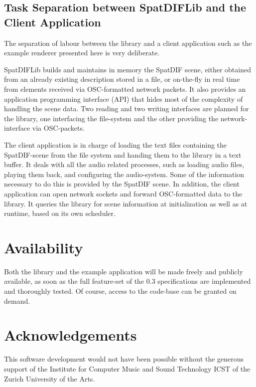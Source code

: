 \documentclass[a4paper]{article}
\begin{document}
\subsection{Task Separation between SpatDIFLib and the Client Application}

The separation of labour between the library and a client application such as the example renderer presented here is very deliberate.

SpatDIFLib builds and maintains in memory the SpatDIF scene, either obtained from an already existing description stored in a file, or on-the-fly in real time from elements received via OSC-formatted network packets.
It also provides an application programming interface (API) that hides most of the complexity of handling the scene data.
Two reading and two writing interfaces are planned for the library, one interfacing the file-system and the other providing the network-interface via OSC-packets.

The client application is in charge of loading the text files containing the SpatDIF-scene from the file system and handing them to the library in a text buffer.
It deals with all the audio related processes, such as loading audio files, playing them back, and configuring the audio-system.
Some of the information necessary to do this is provided by the SpatDIF scene.
In addition, the client application can open network sockets and forward OSC-formatted data to the library.
It queries the library for scene information at initialization as well as at runtime, based on its own scheduler.

\section{Availability}%

Both the library and the example application will be made freely and publicly available, as soon as the full feature-set of the 0.3 specifications are implemented and thoroughly tested.
Of course, access to the code-base can be granted on demand.

\section{Acknowledgements}%

This software development would not have been possible without the generous support of the Institute for Computer Music and Sound Technology ICST of the Zurich University of the Arts.
\end{document}
